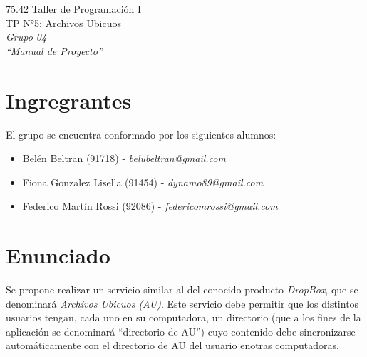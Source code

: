 \documentclass{article}
\begin{document}
\setcounter{page}{5}



\begin{titlepage}
	\vspace*{\fill}
	\begin{center}
		\Large 75.42 Taller de Programación I \\
		\Huge TP N°5: Archivos Ubicuos \\
		\bigskip\huge\textit{Grupo 04} \\
		\bigskip\bigskip\bigskip\bigskip\bigskip\bigskip
		\bigskip\bigskip\bigskip\bigskip\bigskip\bigskip\bigskip
		\medskip\huge\textit{``Manual de Proyecto''} \\
		\date{}
	\end{center}
	\vspace*{\fill}
\end{titlepage}
\newpage




\tableofcontents
\newpage
{}




\section{Ingregrantes}

	El grupo se encuentra conformado por los siguientes alumnos:
	\smallskip

	\begin{itemize}
	\itemsep=5pt \topsep=0pt \partopsep=0pt \parskip=0pt \parsep=0pt

		\item Belén Beltran (91718) - \textit{belubeltran@gmail.com}
		\item Fiona Gonzalez Lisella (91454) - \textit{dynamo89@gmail.com}
		\item Federico Martín Rossi (92086) - \textit{federicomrossi@gmail.com}

	\end{itemize}	
\bigskip




\section{Enunciado}
	
	Se propone realizar un servicio similar al del conocido producto \textit{DropBox}\cite{DROPBOX}, que se denominará \textit{Archivos Ubicuos (AU)}. Este servicio debe permitir que los distintos usuarios tengan, cada uno en su computadora, un directorio (que a los fines de la aplicación se denominará ``directorio de AU'') cuyo contenido debe sincronizarse automáticamente con el directorio de AU del usuario enotras computadoras.
\bigskip
\end{document}
